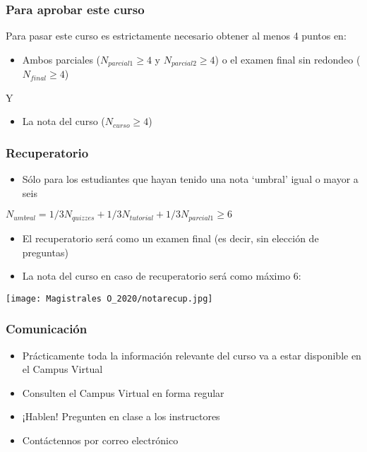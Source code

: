 \documentclass[14pt]{beamer}
\begin{document}
\begin{frame}
\frametitle{Para aprobar este curso}
Para pasar este curso es estrictamente necesario obtener al menos 4 puntos en:
\vspace{2mm}
\begin{itemize}
    \item Ambos parciales ($N_{parcial 1} \geq 4$ y $N_{parcial 2} \geq 4$) o el examen final sin redondeo ($N_{final} \geq 4$)
\end{itemize}
\centering Y
\vspace{2mm}
\begin{itemize}
    \item La nota del curso ($N_{curso} \geq 4$)
\end{itemize}
\end{frame}

\begin{frame}
\frametitle{Recuperatorio}
\begin{itemize}
    \item Sólo para los estudiantes que hayan tenido una nota ‘umbral’ igual o mayor a seis
\end{itemize}
    $N_{umbral}=1/3N_{quizzes}+1/3N_{tutorial}+1/3N_{parcial 1} \geq 6$
\begin{itemize}
    \item El recuperatorio será como un examen final (es decir, sin elección de preguntas)
    \item La nota del curso en caso de recuperatorio será como máximo 6:
\end{itemize}
\centering
\texttt{[image: Magistrales O\_2020/notarecup.jpg]}
\end{frame}


\begin{frame}
\frametitle{Comunicación}
\begin{itemize}
    \item Prácticamente toda la información relevante del curso va a estar disponible en el Campus Virtual
    \item Consulten el Campus Virtual en forma regular
    \item ¡Hablen! Pregunten en clase a los instructores
    \item Contáctennos por correo electrónico 
\end{itemize}
\end{frame}
\end{document}
